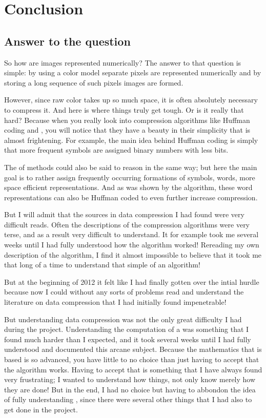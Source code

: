 \begin{comment}
  
\end{comment}

\chapter{Conclusion}
\label{cha:conclus}

\section{Answer to the question}

So how are images represented numerically? The answer to that question
is simple: by using a color model separate pixels are represented
numerically and by storing a long sequence of such pixels images are
formed.

However, since raw color takes up so much space, it is often
absolutely necessary to compress it. And here is where things truly
get tough. Or is it really that hard? Because when you really look
into compression algorithms like Huffman coding and \lzw, you will
notice that they have a beauty in their simplicity that is almost
frightening. For example, the main idea behind Huffman coding is
simply that more frequent symbols are assigned binary numbers with
less bits.

The \lzfam of methods could also be said to reason in the same way;
but here the main goal is to rather assign frequently occurring
formations of symbols, words, more space efficient
representations. And as was shown by the  algorithm, these
word representations can also be Huffman coded to even further
increase compression.

But I will admit that the sources in data compression I had found were
very difficult reads. Often the descriptions of the compression
algorithms were very terse, and as a result very difficult to
understand. It for example took me several weeks until I had fully
understood how the \lzw algorithm worked! Rereading my own description
of the algorithm, I find it almost impossible to believe that it took
me that long of a time to understand that simple of an algorithm!

But at the beginning of 2012 it felt like I had finally gotten over
the intial hurdle because now I could without any sorts of problems
read and understand the literature on data compression that I had
initially found impenetrable!

But understanding data compression was not the only great difficulty I
had during the project. Understanding the computation of a \crc was
something that I found much harder than I expected, and it took
several weeks until I had fully understood and documented this arcane
subject. Because the mathematics that \crc is based is so advanced,
you have little to no choice than just having to accept that the
algorithm works. Having to accept that is something that I have always
found very frustrating; I wanted to understand how things, not only
know merely how they are done! But in the end, I had no choice but
having to abbondon the idea of fully understanding \crc, since there
were several other things that I had also to get done in the project.

